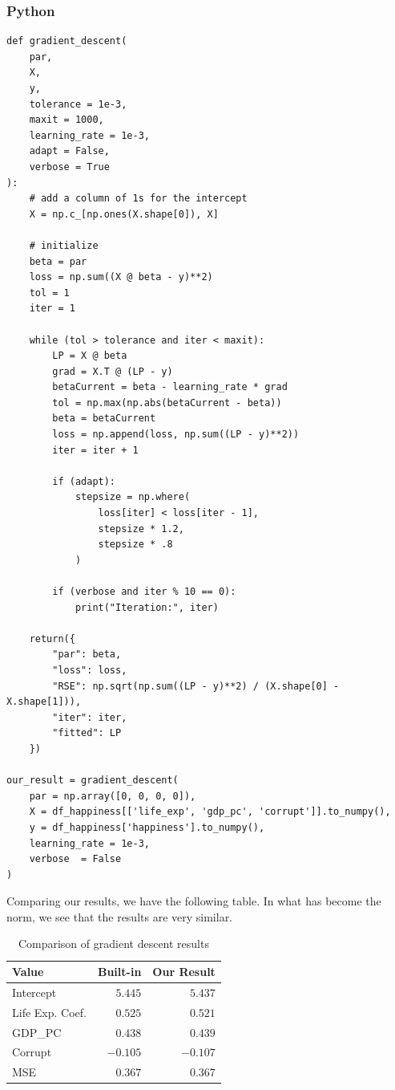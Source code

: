 \documentclass[
  letterpaper,
]{krantz}
\begin{document}
\subsubsection{Python}

\begin{verbatim}
def gradient_descent(
    par, 
    X, 
    y, 
    tolerance = 1e-3, 
    maxit = 1000, 
    learning_rate = 1e-3, 
    adapt = False, 
    verbose = True
):
    # add a column of 1s for the intercept
    X = np.c_[np.ones(X.shape[0]), X]
    
    # initialize
    beta = par
    loss = np.sum((X @ beta - y)**2)
    tol = 1
    iter = 1

    while (tol > tolerance and iter < maxit):
        LP = X @ beta
        grad = X.T @ (LP - y)
        betaCurrent = beta - learning_rate * grad
        tol = np.max(np.abs(betaCurrent - beta))
        beta = betaCurrent
        loss = np.append(loss, np.sum((LP - y)**2))
        iter = iter + 1

        if (adapt):
            stepsize = np.where(
                loss[iter] < loss[iter - 1], 
                stepsize * 1.2, 
                stepsize * .8
            )

        if (verbose and iter % 10 == 0):
            print("Iteration:", iter)

    return({
        "par": beta,
        "loss": loss,
        "RSE": np.sqrt(np.sum((LP - y)**2) / (X.shape[0] - X.shape[1])),
        "iter": iter,
        "fitted": LP
    })

our_result = gradient_descent(
    par = np.array([0, 0, 0, 0]),
    X = df_happiness[['life_exp', 'gdp_pc', 'corrupt']].to_numpy(),
    y = df_happiness['happiness'].to_numpy(),
    learning_rate = 1e-3,
    verbose  = False
)
\end{verbatim}

Comparing our results, we have the following table. In what has become
the norm, we see that the results are very similar.

\begin{longtable}{lrr}

\caption{\label{tbl-gradient-descent}Comparison of gradient descent
results}

\tabularnewline

\toprule
Value & Built-in & Our Result \\ 
\midrule\addlinespace[2.5pt]
Intercept & \textcolor[HTML]{404040}{$5.445$} & \textcolor[HTML]{404040}{$5.437$} \\ 
Life Exp. Coef. & \textcolor[HTML]{404040}{$0.525$} & \textcolor[HTML]{404040}{$0.521$} \\ 
GDP\_PC & \textcolor[HTML]{404040}{$0.438$} & \textcolor[HTML]{404040}{$0.439$} \\ 
Corrupt & \textcolor[HTML]{404040}{$-0.105$} & \textcolor[HTML]{404040}{$-0.107$} \\ 
MSE & \textcolor[HTML]{404040}{$0.367$} & \textcolor[HTML]{404040}{$0.367$} \\ 
\bottomrule

\end{longtable}
\end{document}
